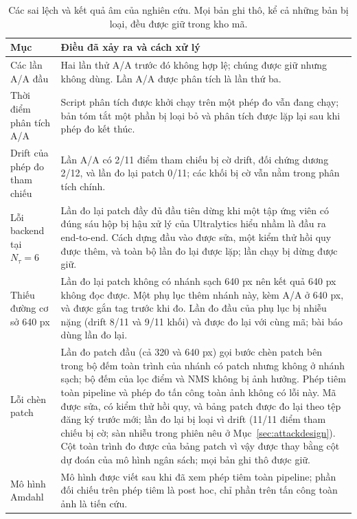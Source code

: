 \documentclass[a4paper,fleqn]{cas-dc}
\newcommand{\Ntau}{N_{\tau}}
\begin{document}
\begin{table}[!tp]
\centering\small
\caption{Các sai lệch và kết quả âm của nghiên cứu. Mọi bản ghi thô, kể cả những bản bị loại, đều được giữ trong kho mã.}
\label{tab:dev}
\begin{tabularx}{\textwidth}{@{}lX@{}}
\toprule
Mục & Điều đã xảy ra và cách xử lý \\
\midrule
Các lần A/A đầu & Hai lần thử A/A trước đó không hợp lệ; chúng được giữ nhưng không dùng. Lần A/A được phân tích là lần thứ ba. \\
Thời điểm phân tích A/A & Script phân tích được khởi chạy trên một phép đo vẫn đang chạy; bản tóm tắt một phần bị loại bỏ và phân tích được lặp lại sau khi phép đo kết thúc. \\
Drift của phép đo tham chiếu & Lần A/A có 2/11 điểm tham chiếu bị cờ drift, đối chứng dương 2/12, và lần đo lại patch 0/11; các khối bị cờ vẫn nằm trong phân tích chính. \\
Lỗi backend tại $\Ntau=6$ & Lần đo lại patch đầy đủ đầu tiên dừng khi một tập ứng viên có đúng sáu hộp bị hậu xử lý của Ultralytics hiểu nhầm là đầu ra end-to-end. Cách dựng đầu vào được sửa, một kiểm thử hồi quy được thêm, và toàn bộ lần đo lại được lặp; lần chạy bị dừng được giữ. \\
Thiếu đường cơ sở 640 px & Lần đo lại patch không có nhánh sạch 640 px nên kết quả 640 px không đọc được. Một phụ lục thêm nhánh này, kèm A/A ở 640 px, và được gắn tag trước khi đo. Lần đo đầu của phụ lục bị nhiễu nặng (drift 8/11 và 9/11 khối) và được đo lại với cùng mã; bài báo dùng lần đo lại. \\
Lỗi chèn patch & Lần đo patch đầu (cả 320 và 640 px) gọi bước chèn patch bên trong bộ đếm toàn trình của nhánh có patch nhưng không ở nhánh sạch; bộ đếm của lọc điểm và NMS không bị ảnh hưởng. Phép tiêm toàn pipeline và phép đo tấn công toàn ảnh không có lỗi này. Mã được sửa, có kiểm thử hồi quy, và bảng patch được đo lại theo tệp đăng ký trước mới; lần đo lại bị loại vì drift (11/11 điểm tham chiếu bị cờ; sàn nhiễu trong phiên nêu ở Mục~\ref{sec:attackdesign}). Cột toàn trình đo được của bảng patch vì vậy được thay bằng cột dự đoán của mô hình ngân sách; mọi bản ghi thô được giữ. \\
Mô hình Amdahl & Mô hình được viết sau khi đã xem phép tiêm toàn pipeline; phần đối chiếu trên phép tiêm là post hoc, chỉ phần trên tấn công toàn ảnh là tiến cứu. \\
\bottomrule
\end{tabularx}
\end{table}
\end{document}
